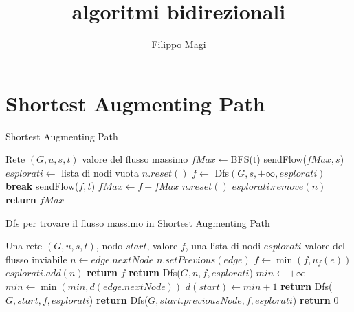 \documentclass{article}
\title{algoritmi bidirezionali}
\author{Filippo Magi }
\begin{document}
\section{Shortest Augmenting Path}
\begin{algorithm}
    \caption{Shortest Augmenting Path}
    \begin{algorithmic}
        \REQUIRE Rete $(G,u,s,t)$
        \ENSURE valore del flusso massimo
        \STATE $fMax \leftarrow $BFS(t) 
        \STATE sendFlow($fMax,s$)
        \STATE $esplorati \leftarrow $ lista di nodi vuota
        \STATE $n.reset()$ 
        \ENDFOR
        \STATE $f \leftarrow$ Dfs$(G, s, +\infty,esplorati)$
        \STATE \textbf{break}
        \ENDIF
        \STATE sendFlow($f,t$)
        \STATE $fMax \leftarrow f + fMax $
        \STATE $n.reset()$
        \STATE $ esplorati.remove(n)$
        \ENDFOR
        \ENDWHILE
        \STATE \textbf{return} $fMax$
    \end{algorithmic}
\end{algorithm}

\begin{algorithm}
    \caption{Dfs per trovare il flusso massimo in Shortest Augmenting Path}
    \begin{algorithmic}
        \REQUIRE Una rete $(G,u,s,t)$, nodo $start$, valore $f$, una lista di nodi $esplorati$
        \ENSURE valore del flusso inviabile 
        \STATE $n \leftarrow edge.nextNode$
        \STATE $n.setPrevious(edge)$ 
        \STATE $f \leftarrow \min(f,u_f(e))$
        \STATE $esplorati.add(n)$
        \STATE \textbf{return} $f$
        \ENDIF
        \STATE \textbf{return} Dfs($G,n,f,esplorati$)
        \ENDIF
        \ENDFOR
        \STATE $min \leftarrow +\infty$
        \STATE $min \leftarrow \min(min, d(edge.nextNode))$
        \ENDIF
        \ENDFOR
        \STATE $d(start)\leftarrow min+1$
        \STATE \textbf{return} Dfs($G,start,f,esplorati$)
        \ELSE
        \STATE \textbf{return} Dfs($G,start.previousNode,f,esplorati$)
        \ENDIF
        \ENDIF
        \STATE \textbf{return} 0
    \end{algorithmic}
\end{algorithm}
\end{document}
